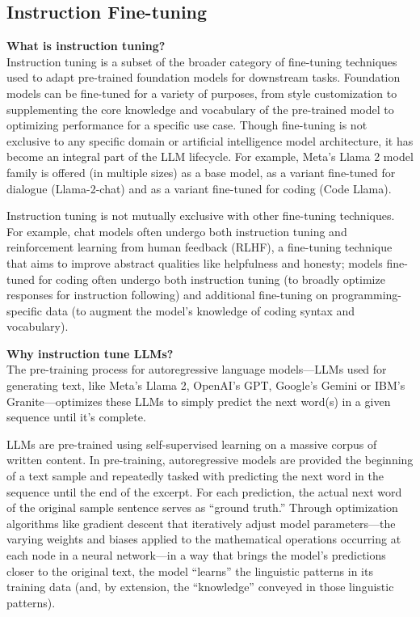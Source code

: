\subsection{Instruction Fine-tuning} 

\hfill \break
\textbf{What is instruction tuning?} \\

\hfill \break
Instruction tuning is a subset of the broader category of fine-tuning techniques used to adapt pre-trained foundation models for downstream tasks. Foundation models can be fine-tuned for a variety of purposes, from style customization to supplementing the core knowledge and vocabulary of the pre-trained model to optimizing performance for a specific use case. Though fine-tuning is not exclusive to any specific domain or artificial intelligence model architecture, it has become an integral part of the LLM lifecycle. For example, Meta’s Llama 2 model family is offered (in multiple sizes) as a base model, as a variant fine-tuned for dialogue (Llama-2-chat) and as a variant fine-tuned for coding (Code Llama).


\hfill \break
Instruction tuning is not mutually exclusive with other fine-tuning techniques. For example, chat models often undergo both instruction tuning and reinforcement learning from human feedback (RLHF), a fine-tuning technique that aims to improve abstract qualities like helpfulness and honesty; models fine-tuned for coding often undergo both instruction tuning (to broadly optimize responses for instruction following) and additional fine-tuning on programming-specific data (to augment the model’s knowledge of coding syntax and vocabulary).

\hfill \break
\textbf{Why instruction tune LLMs?} \\
\hfill \break
The pre-training process for autoregressive language models—LLMs used for generating text, like Meta’s Llama 2, OpenAI’s GPT, Google’s Gemini or IBM’s Granite—optimizes these LLMs to simply predict the next word(s) in a given sequence until it’s complete.

\hfill \break
LLMs are pre-trained using self-supervised learning on a massive corpus of written content. In pre-training, autoregressive models are provided the beginning of a text sample and repeatedly tasked with predicting the next word in the sequence until the end of the excerpt. For each prediction, the actual next word of the original sample sentence serves as “ground truth.” Through optimization algorithms like gradient descent that iteratively adjust model parameters—the varying weights and biases applied to the mathematical operations occurring at each node in a neural network—in a way that brings the model’s predictions closer to the original text, the model “learns” the linguistic patterns in its training data (and, by extension, the “knowledge” conveyed in those linguistic patterns).

